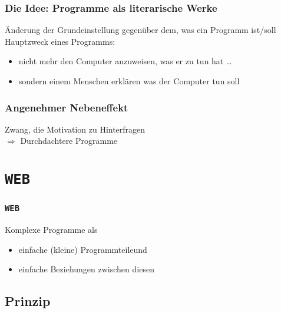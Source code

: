 \documentclass[10pt]{beamer}
\def\WEB{{\tt WEB}}
\begin{document}
\begin{frame}
	\frametitle{Die Idee: Programme als literarische Werke}
	\begin{block}{Änderung der Grundeinstellung gegenüber dem, was ein Programm ist/soll}
		Hauptzweck eines Programms:
		\begin{itemize}
			\item nicht mehr den Computer anzuweisen, was er zu tun hat \pause \dots
			\item sondern einem Menschen erklären was der Computer tun soll
		\end{itemize}
	\end{block}
\end{frame}
\begin{comment}
\begin{frame}
	\frametitle{Die Idee: Programme als literarische Werke}
	{Das Programm muss:}
	\begin{itemize}
		\item ``angenehm'' zu lesen und \dots
		\item gut verständlich sein\pause
	\end{itemize}
		{Es soll trotzdem:}
	\begin{itemize}
		\item korrekt kompilieren
		\item dann das tun, was es sollte
	\end{itemize}
\end{frame}
\end{comment}

\begin{frame}
	\frametitle{Angenehmer Nebeneffekt}
	Zwang, die Motivation zu Hinterfragen\pause \\
	$\Rightarrow$ Durchdachtere Programme
\end{frame}

\section{\WEB}
\begin{frame}
	\frametitle{\WEB}
	Komplexe Programme als
	\begin{itemize}
		\item einfache (kleine) Programmteile\pause und
		\item einfache Beziehungen zwischen diesen
	\end{itemize}
\end{frame}
\subsection{Prinzip}
\end{document}
